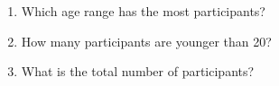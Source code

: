 \begin{enumerate}[label=\color{blue}\arabic*.]
    \begin{enumerate}[label=(\alph*)]
        \item Which age range has the most participants?
        \item How many participants are younger than 20?
        \item What is the total number of participants?
    \end{enumerate}
\end{enumerate}

